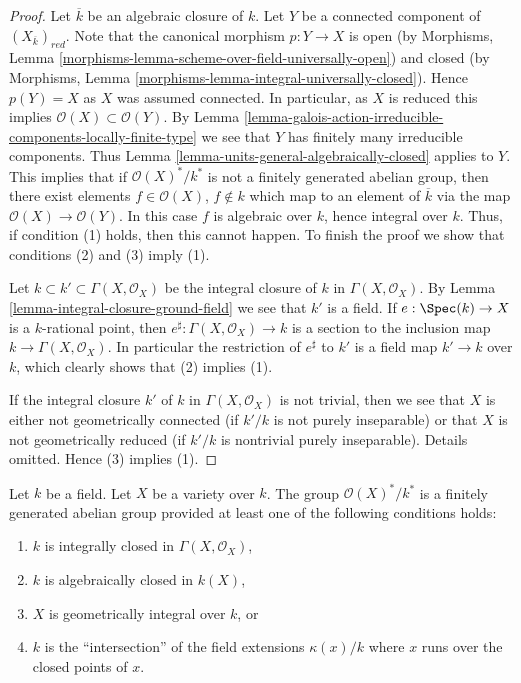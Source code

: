 \begin{proof}
Let $\overline{k}$ be an algebraic closure of $k$.
Let $Y$ be a connected component of $(X_{\overline{k}})_{red}$.
Note that the canonical morphism $p : Y \to X$ is open (by
Morphisms, Lemma \ref{morphisms-lemma-scheme-over-field-universally-open})
and closed (by
Morphisms, Lemma \ref{morphisms-lemma-integral-universally-closed}).
Hence $p(Y) = X$ as $X$ was assumed connected. In particular, as
$X$ is reduced this implies $\mathcal{O}(X) \subset \mathcal{O}(Y)$. By
Lemma \ref{lemma-galois-action-irreducible-components-locally-finite-type}
we see that $Y$ has finitely many irreducible components.
Thus
Lemma \ref{lemma-units-general-algebraically-closed}
applies to $Y$. This implies that if $\mathcal{O}(X)^*/k^*$ is
not a finitely generated abelian group, then there exist elements
$f \in \mathcal{O}(X)$, $f \not \in k$ which map to an element of
$\overline{k}$ via the map $\mathcal{O}(X) \to \mathcal{O}(Y)$.
In this case $f$ is algebraic over $k$, hence
integral over $k$. Thus, if condition (1) holds, then this cannot happen.
To finish the proof we show that conditions (2) and (3) imply (1).

\medskip\noindent
Let $k \subset k' \subset \Gamma(X, \mathcal{O}_X)$ be the integral
closure of $k$ in $\Gamma(X, \mathcal{O}_X)$. By
Lemma \ref{lemma-integral-closure-ground-field}
we see that $k'$ is a field.
If $e : \Spec(k) \to X$ is a $k$-rational point, then
$e^\sharp : \Gamma(X, \mathcal{O}_X) \to k$ is a section to the
inclusion map $k \to \Gamma(X, \mathcal{O}_X)$. In particular the
restriction of $e^\sharp$ to $k'$ is a field map $k' \to k$ over $k$,
which clearly shows that (2) implies (1).

\medskip\noindent
If the integral closure $k'$ of $k$ in $\Gamma(X, \mathcal{O}_X)$
is not trivial, then we see that $X$ is either not geometrically connected
(if $k'/k$ is not purely inseparable) or that $X$ is not
geometrically reduced (if $k'/k$ is nontrivial purely inseparable).
Details omitted. Hence (3) implies (1).
\end{proof}

\begin{lemma}
\label{lemma-units-variety}
Let $k$ be a field.
Let $X$ be a variety over $k$.
The group $\mathcal{O}(X)^*/k^*$ is a finitely generated abelian group
provided at least one of the following conditions holds:
\begin{enumerate}
\item $k$ is integrally closed in $\Gamma(X, \mathcal{O}_X)$,
\item $k$ is algebraically closed in $k(X)$,
\item $X$ is geometrically integral over $k$, or
\item $k$ is the ``intersection'' of the field extensions
$\kappa(x)/k$ where $x$ runs over the closed points of $x$.
\end{enumerate}
\end{lemma}

